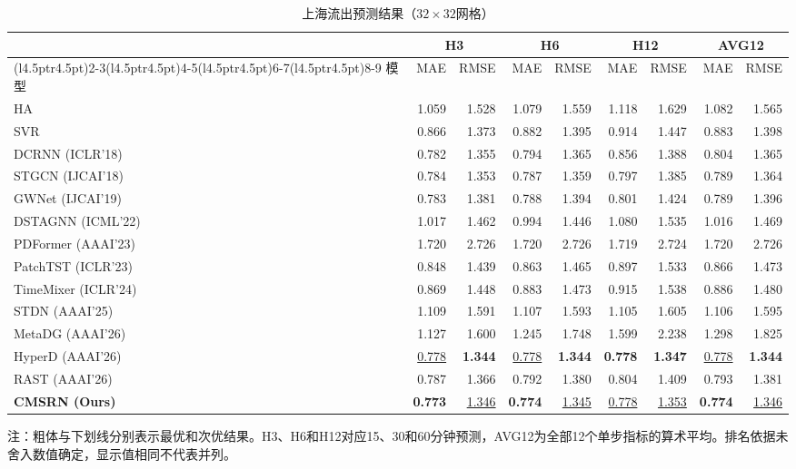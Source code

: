 \begin{table}[!htbp]
\centering
\caption{上海流出预测结果（\(32\times32\)网格）}
\label{tab:shanghai-outflow}
\begingroup
\linespread{1}\fontsize{10}{12}\selectfont
\setlength{\tabcolsep}{4.5pt}
\renewcommand{\arraystretch}{1.05}
\begin{tabular*}{\linewidth}{@{\extracolsep{\fill}}l*{8}{r}@{}}
\toprule
& \multicolumn{2}{c}{H3} & \multicolumn{2}{c}{H6} & \multicolumn{2}{c}{H12} & \multicolumn{2}{c}{AVG12} \\
\cmidrule(l{4.5pt}r{4.5pt}){2-3}\cmidrule(l{4.5pt}r{4.5pt}){4-5}\cmidrule(l{4.5pt}r{4.5pt}){6-7}\cmidrule(l{4.5pt}r{4.5pt}){8-9}
模型 & MAE & RMSE & MAE & RMSE & MAE & RMSE & MAE & RMSE \\
\midrule
HA & 1.059 & 1.528 & 1.079 & 1.559 & 1.118 & 1.629 & 1.082 & 1.565 \\
SVR & 0.866 & 1.373 & 0.882 & 1.395 & 0.914 & 1.447 & 0.883 & 1.398 \\
DCRNN (ICLR'18) & 0.782 & 1.355 & 0.794 & 1.365 & 0.856 & 1.388 & 0.804 & 1.365 \\
STGCN (IJCAI'18) & 0.784 & 1.353 & 0.787 & 1.359 & 0.797 & 1.385 & 0.789 & 1.364 \\
GWNet (IJCAI'19) & 0.783 & 1.381 & 0.788 & 1.394 & 0.801 & 1.424 & 0.789 & 1.396 \\
DSTAGNN (ICML'22) & 1.017 & 1.462 & 0.994 & 1.446 & 1.080 & 1.535 & 1.016 & 1.469 \\
PDFormer (AAAI'23) & 1.720 & 2.726 & 1.720 & 2.726 & 1.719 & 2.724 & 1.720 & 2.726 \\
PatchTST (ICLR'23) & 0.848 & 1.439 & 0.863 & 1.465 & 0.897 & 1.533 & 0.866 & 1.473 \\
TimeMixer (ICLR'24) & 0.869 & 1.448 & 0.883 & 1.473 & 0.915 & 1.538 & 0.886 & 1.480 \\
STDN (AAAI'25) & 1.109 & 1.591 & 1.107 & 1.593 & 1.105 & 1.605 & 1.106 & 1.595 \\
MetaDG (AAAI'26) & 1.127 & 1.600 & 1.245 & 1.748 & 1.599 & 2.238 & 1.298 & 1.825 \\
HyperD (AAAI'26) & \underline{0.778} & \textbf{1.344} & \underline{0.778} & \textbf{1.344} & \textbf{0.778} & \textbf{1.347} & \underline{0.778} & \textbf{1.344} \\
RAST (AAAI'26) & 0.787 & 1.366 & 0.792 & 1.380 & 0.804 & 1.409 & 0.793 & 1.381 \\
\midrule
\textbf{CMSRN (Ours)} & \textbf{0.773} & \underline{1.346} & \textbf{0.774} & \underline{1.345} & \underline{0.778} & \underline{1.353} & \textbf{0.774} & \underline{1.346} \\
\bottomrule
\end{tabular*}
\endgroup
\par\smallskip
\begin{minipage}{\linewidth}
\footnotesize\linespread{1.1}\selectfont\raggedright
注：粗体与下划线分别表示最优和次优结果。H3、H6和H12对应15、30和60分钟预测，AVG12为全部12个单步指标的算术平均。排名依据未舍入数值确定，显示值相同不代表并列。
\end{minipage}
\end{table}
